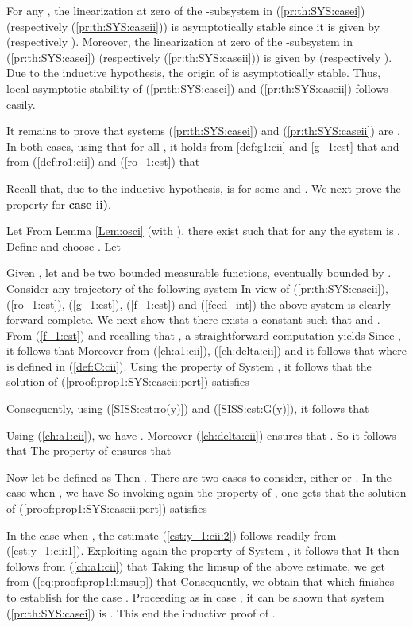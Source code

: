 \documentclass[letterpaper, 10pt]{article}
\newcommand{\rref}[1]{(\ref{#1})}
\begin{document}
For any , the linearization at zero of the -subsystem in \rref{pr:th:SYS:casei} (respectively  \rref{pr:th:SYS:caseii}) is asymptotically stable since it is given by  (respectively ). Moreover, the linearization at zero of the -subsystem in \rref{pr:th:SYS:casei} (respectively  \rref{pr:th:SYS:caseii}) is given by  (respectively ). Due to the inductive hypothesis, the origin of  is asymptotically stable. Thus, local asymptotic stability of \rref{pr:th:SYS:casei} and  \rref{pr:th:SYS:caseii} follows easily.






It remains to prove that systems \rref{pr:th:SYS:casei} and \rref{pr:th:SYS:caseii} are . In both cases, using that  for all , it holds from \eqref{def:g1:cii} and \eqref{g_1:est} that
 and from \rref{def:ro1:cii} and \rref{ro_1:est} that




Recall that, due to the inductive hypothesis,  is  for some  and . We next prove the  property for {\bf case ii)}.

Let 
 From Lemma \ref{Lem:osci} (with ), there exist  such that for any  the system
 is . Define
and choose .  Let 

Given , let  and  be two bounded measurable functions, eventually bounded by . Consider any trajectory  of the following system
In view of \rref{pr:th:SYS:caseii}, \rref{ro_1:est}, \rref{g_1:est}, \rref{f_1:est} and \rref{feed_int} the above system is clearly forward complete. We next show that there exists a constant  such that  and . 
From \rref{f_1:est} and recalling that , a straightforward computation yields
 Since , it follows that
Moreover from \rref{ch:a1:cii}, \rref{ch:delta:cii} and  it follows that
 where  is defined in \rref{def:C:cii}. Using the  property of System , it follows  that the solution of \rref{proof:prop1:SYS:caseii:pert} satisfies 
 
Consequently, using \rref{SISS:est:ro(y)} and \rref{SISS:est:G(y)}, it follows that

Using \rref{ch:a1:cii}, we have . Moreover \rref{ch:delta:cii} ensures that . So it follows that
 The  property of  ensures that


Now let  be defined as
 Then . There are two cases to consider, either  or . In the case when , we have
 So invoking again the  property of , one gets that the solution of \rref{proof:prop1:SYS:caseii:pert} satisfies

 In the case when , the estimate \rref{est:y_1:cii:2} follows readily from \rref{est:y_1:cii:1}. Exploiting again the  property of System , it follows that
 It then follows from \rref{ch:a1:cii} that
 Taking the limsup of the above estimate, we get from \rref{eq:proof:prop1:limsup} that
 Consequently, we obtain that
 which finishes to establish  for the case . Proceeding as in case , it can be shown that system \rref{pr:th:SYS:casei} is . This end the inductive proof of . 
\newline
\end{document}
